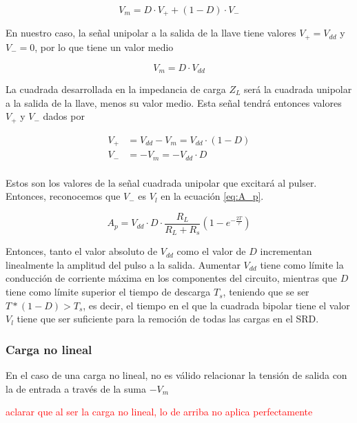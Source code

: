 \begin{equation}
    V_m = D \cdot V_+ + (1-D) \cdot V_-
\end{equation}

En nuestro caso, la señal unipolar a la salida de la llave tiene valores
$V_+=V_{dd}$ y $V_-=0$, por lo que tiene un valor medio

\begin{equation}
    V_m = D \cdot V_{dd}
\end{equation}

La cuadrada desarrollada en la impedancia de carga $Z_L$ será la cuadrada
unipolar a la salida de la llave, menos su valor medio. Esta señal tendrá
entonces valores $V_+$ y $V_-$ dados por

\begin{equation}
    \begin{aligned}
        V_+ &= V_{dd}-V_m = V_{dd} \cdot (1-D) \\
        V_- &= -V_m = -V_{dd} \cdot D \\
    \end{aligned}
\end{equation}

Estos son los valores de la señal cuadrada unipolar que excitará al pulser.
Entonces, reconocemos que $V_-$ es $V_l$ en la ecuación \ref{eq:A_p}.

\begin{equation}
    A_p = V_{dd} \cdot D \cdot \frac{R_L}{R_L+R_s} \left( 1-e^{-\frac{2T}{\tau}}\right)
\end{equation}

Entonces, tanto el valor absoluto de $V_{dd}$ como el valor de $D$ incrementan
linealmente la amplitud del pulso a la salida. Aumentar $V_{dd}$ tiene como
límite la conducción de corriente máxima en los componentes del circuito,
mientras que $D$ tiene como límite superior el tiempo de descarga $T_s$,
teniendo que se ser $T*(1-D) > T_s$, es decir, el tiempo en el que la cuadrada
bipolar tiene el valor $V_l$ tiene que ser suficiente para la remoción de todas
las cargas en el SRD.

\subsubsection{Carga no lineal}

En el caso de una carga no lineal, no es válido relacionar la tensión de salida
con la de entrada a través de la suma $-V_m$

\textcolor{red}{aclarar que al ser la carga no lineal, lo de arriba no aplica
perfectamente}

